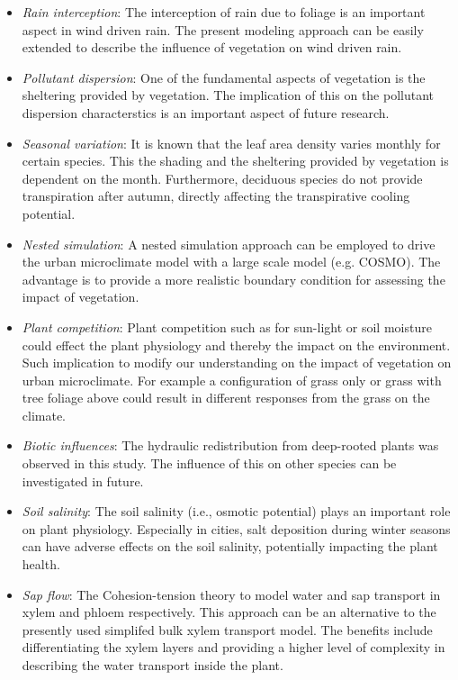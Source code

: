 \begin{itemize}
	\item \textit{Rain interception}: The interception of rain due to foliage is an important aspect in wind driven rain. The present modeling approach can be easily extended to describe the influence of vegetation on wind driven rain.

	\item \textit{Pollutant dispersion}: One of the fundamental aspects of vegetation is the sheltering provided by vegetation. The implication of this on the pollutant dispersion characterstics is an important aspect of future research. 
	
	\item \textit{Seasonal variation}: It is known that the  leaf area density varies monthly for certain species. This the shading and the sheltering provided by vegetation is dependent on the month. Furthermore, deciduous species do not provide transpiration after autumn, directly affecting the transpirative cooling potential.
	
	\item \textit{Nested simulation}: A nested simulation approach can be employed to drive the urban microclimate model with a large scale model (e.g. COSMO). The advantage is to provide a more realistic boundary condition for assessing the impact of vegetation.

	\item \textit{Plant competition}: Plant competition such as for sun-light or soil moisture could effect the plant physiology and thereby the impact on the environment. Such implication to modify our understanding on the impact of vegetation on urban microclimate. For example a configuration of grass only or grass with tree foliage above could result in different responses from the grass on the climate.
	
	\item \textit{Biotic influences}: The hydraulic redistribution from deep-rooted plants was observed in this study. The influence of this on other species can be investigated in future.

	\item \textit{Soil salinity}: The soil salinity (i.e., osmotic potential) plays an important role on plant physiology. Especially in cities, salt deposition during winter seasons can have adverse effects on the soil salinity, potentially impacting the plant health. 
	
	\item \textit{Sap flow}: The Cohesion-tension theory to model water and sap transport in xylem and phloem respectively. This approach can be an alternative to the presently used simplifed bulk xylem transport model. The benefits include differentiating the xylem layers and providing a higher level of complexity in describing the water transport inside the plant.
	

\end{itemize}
